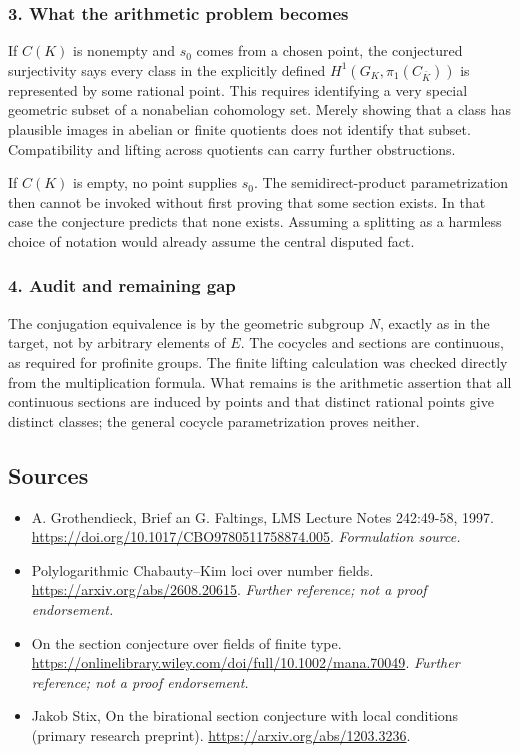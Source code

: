 \documentclass[11pt]{article}
\begin{document}
\subsubsection{3. What the arithmetic problem becomes}
If $C(K)$ is nonempty and $s_0$ comes from a chosen point, the conjectured surjectivity says every class in the explicitly defined $H^1(G_K,\pi_1(C_{\bar K}))$ is represented by some rational point. This requires identifying a very special geometric subset of a nonabelian cohomology set. Merely showing that a class has plausible images in abelian or finite quotients does not identify that subset. Compatibility and lifting across quotients can carry further obstructions.

If $C(K)$ is empty, no point supplies $s_0$. The semidirect-product parametrization then cannot be invoked without first proving that some section exists. In that case the conjecture predicts that none exists. Assuming a splitting as a harmless choice of notation would already assume the central disputed fact.

\subsubsection{4. Audit and remaining gap}
The conjugation equivalence is by the geometric subgroup $N$, exactly as in the target, not by arbitrary elements of $E$. The cocycles and sections are continuous, as required for profinite groups. The finite lifting calculation was checked directly from the multiplication formula. What remains is the arithmetic assertion that all continuous sections are induced by points and that distinct rational points give distinct classes; the general cocycle parametrization proves neither.

\subsection{Sources}
\begin{itemize}
\item[S1]A. Grothendieck, Brief an G. Faltings, LMS Lecture Notes 242:49-58, 1997.
\url{https://doi.org/10.1017/CBO9780511758874.005}.
\textit{Formulation source.}
\item[S2]Polylogarithmic Chabauty--Kim loci over number fields.
\url{https://arxiv.org/abs/2608.20615}.
\textit{Further reference; not a proof endorsement.}
\item[S3]On the section conjecture over fields of finite type.
\url{https://onlinelibrary.wiley.com/doi/full/10.1002/mana.70049}.
\textit{Further reference; not a proof endorsement.}
\item[R1] Jakob Stix, On the birational section conjecture with local conditions (primary research preprint).
\url{https://arxiv.org/abs/1203.3236}.
\end{itemize}
\end{document}
